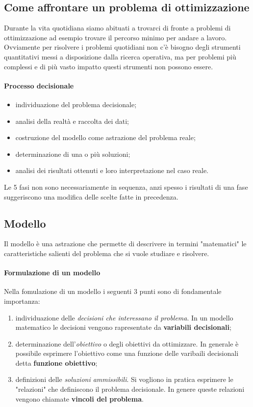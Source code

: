 \documentclass{article}
\begin{document}
    \subsection{Come affrontare un problema di ottimizzazione}
        Durante la vita quotidiana siamo abituati a trovarci di fronte a problemi di ottimizzazione ad esempio trovare il percorso minimo per andare a lavoro. Ovviamente per risolvere i problemi quotidiani non c'è bisogno degli strumenti quantitativi messi a disposizione dalla ricerca operativa, ma per problemi più complessi e di più vasto impatto questi strumenti non possono essere. 
        \paragraph{Processo decisionale}
            \begin{itemize}
                \item individuazione del problema decisionale;
                \item analisi della realtà e raccolta dei dati;
                \item costruzione del modello come astrazione del problema reale;
                \item determinazione di una o più soluzioni;
                \item analisi dei risultati ottenuti e loro interpretazione nel caso reale.
                \end{itemize}
            Le 5 fasi non sono necessariamente in sequenza, anzi spesso i risultati di una fase suggeriscono una modifica delle scelte fatte in precedenza.
    \subsection{Modello}
        Il modello è una astrazione che permette di descrivere in termini "matematici" le caratteristiche salienti del problema che si vuole studiare e risolvere. 
        \paragraph{Formulazione di un modello}
            Nella fomulazione di un modello i seguenti 3 punti sono di fondamentale importanza:
            \begin{enumerate}
                \item individuazione delle \textit{decisioni che interessano il problema}. In un modello matematico le decisioni vengono rapresentate da \textbf{variabili decisionali};
                \item determinazione dell'\textit{obiettivo} o degli obiettivi da ottimizzare. In generale è possibile esprimere l'obiettivo come una funzione delle varibaili decisionali detta \textbf{funzione obiettivo};
                \item definizioni delle \textit{soluzioni ammissibili}. Si vogliono in pratica esprimere le "relazioni" che definiscono il problema decisionale. In genere queste relazioni vengono chiamate \textbf{vincoli del problema}.
            \end{enumerate}
\end{document}
